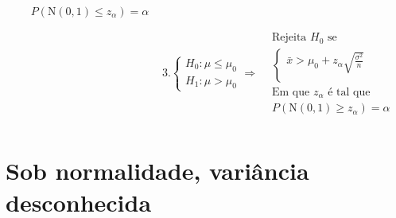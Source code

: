\documentclass[
  letterpaper,
  DIV=11,
  numbers=noendperiod]{scrreprt}
\begin{document}
\[\begin{aligned}
\begin{aligned}
& P\left( \mathrm{N(0,1)} \leq z_{\alpha} \right) = \alpha
\end{aligned} \\ \\
& 3.
\begin{cases}
H_{0} : \mu \leq \mu_{0} \\
H_{1}: \mu > \mu_{0}
\end{cases} \Rightarrow 
\begin{aligned}
&\text{Rejeita $H_{0}$ se} \\
&\begin{cases}
\bar{x} > \mu_{0} + z_{\alpha} \sqrt{ \frac{\sigma^2}{n} } \\
\end{cases} \\
& \text{Em que $z_{\alpha}$ é tal que} \\
& P\left( \mathrm{N(0,1)} \geq z_{\alpha} \right) = \alpha
\end{aligned} \\
\end{aligned}
\]

\section{Sob normalidade, variância
desconhecida}\label{sec-normalidade-vardesc}
\end{document}
